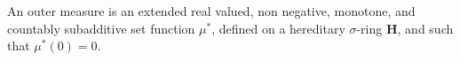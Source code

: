 An outer measure is an extended real valued, non negative, monotone, and countably subadditive set function $\mu^*$, defined on a hereditary $\sigma$-ring $\mathbf{H}$, and such that $\mu^*(0) = 0$.
